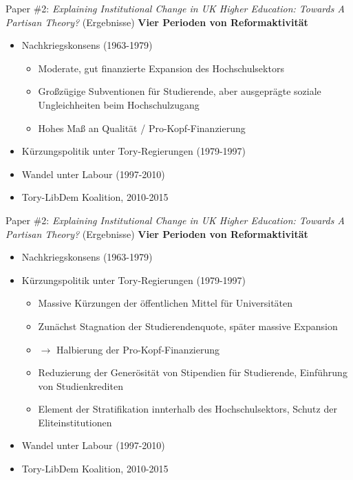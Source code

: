 \documentclass[
  ignorenonframetext,
]{beamer}
\begin{document}
\begin{frame}{Paper \#2: \emph{Explaining Institutional Change in UK
Higher Education: Towards A Partisan Theory?} (Ergebnisse)}
\protect\hypertarget{paper-2-explaining-institutional-change-in-uk-higher-education-towards-a-partisan-theory-ergebnisse}{}
\textbf{Vier Perioden von Reformaktivität}

\begin{itemize}
\item{Nachkriegskonsens (1963-1979)}
\begin{itemize}
\item{Moderate, gut finanzierte Expansion des Hochschulsektors}
\item{Großzügige Subventionen für Studierende, aber ausgeprägte soziale Ungleichheiten beim Hochschulzugang}
\item{Hohes Maß an Qualität / Pro-Kopf-Finanzierung}
\end{itemize}
\item{Kürzungspolitik unter Tory-Regierungen (1979-1997)}
\item{Wandel unter Labour (1997-2010)}
\item{Tory-LibDem Koalition, 2010-2015}
\end{itemize}
\end{frame}

\begin{frame}{Paper \#2: \emph{Explaining Institutional Change in UK
Higher Education: Towards A Partisan Theory?} (Ergebnisse)}
\protect\hypertarget{paper-2-explaining-institutional-change-in-uk-higher-education-towards-a-partisan-theory-ergebnisse-1}{}
\textbf{Vier Perioden von Reformaktivität}

\begin{itemize}
\item{Nachkriegskonsens (1963-1979)}
\item{Kürzungspolitik unter Tory-Regierungen (1979-1997)}
\begin{itemize}
\item{Massive Kürzungen der öffentlichen Mittel für Universitäten}
\item{Zunächst Stagnation der Studierendenquote, später massive Expansion}
\item{$\rightarrow$ Halbierung der Pro-Kopf-Finanzierung}
\item{Reduzierung der Generösität von Stipendien für Studierende, Einführung von Studienkrediten}
\item{Element der Stratifikation innterhalb des Hochschulsektors, Schutz der Eliteinstitutionen}
\end{itemize}
\item{Wandel unter Labour (1997-2010)}
\item{Tory-LibDem Koalition, 2010-2015}
\end{itemize}
\end{frame}
\end{document}
